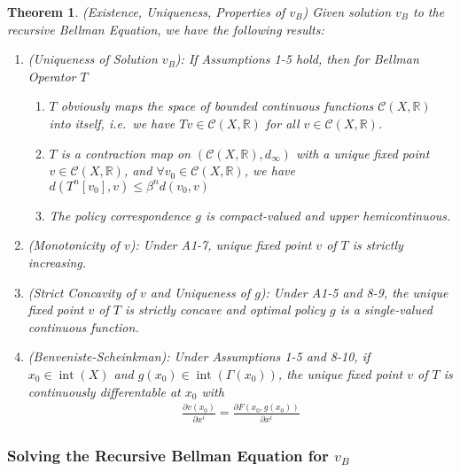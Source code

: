 \documentclass[12pt]{article}
\numberwithin{equation}{section} %
\theoremstyle{plain}
\newtheorem{thm}{Theorem}[section]
\theoremstyle{definition}
\theoremstyle{remark}
\newcommand{\sC}{\mathscr{C}}
\newcommand{\R}{\mathbb{R}}
\newcommand{\interior}{\operatorname{int}}
\begin{document}
\begin{thm}(Existence, Uniqueness, Properties of $v_B$)
Given solution $v_B$ to the recursive Bellman Equation,
we have the following results:
\begin{enumerate}
  \item
    \emph{(Uniqueness of Solution $v_B$)}:
    If Assumptions 1-5 hold, then for Bellman Operator $T$
    \begin{enumerate}[label=\emph{(\alph*)}]
      \item $T$ obviously maps the space of bounded continuous functions
        $\sC(X,\R)$ into itself, i.e.\ we have
        $Tv \in \sC(X,\R)$ for all $v\in\sC(X,\R)$.
      \item
        $T$ is a contraction map on $(\sC(X,\R),d_\infty)$ with a unique
        fixed point $v \in\sC(X,\R)$, and
        $\forall v_0 \in \sC(X,\R)$, we have
        $d(T^n[v_0],v) \leq \beta^n d(v_0,v)$
      \item
        The policy correspondence $g$ is compact-valued and upper
        hemicontinuous.
    \end{enumerate}

  \item
    \emph{(Monotonicity of $v$)}:
    Under A1-7, unique fixed point $v$ of $T$ is strictly increasing.

  \item
    \emph{(Strict Concavity of $v$ and Uniqueness of $g$)}:
    Under A1-5 and 8-9, the unique fixed point $v$ of $T$ is
    strictly concave and optimal policy $g$ is a single-valued
    continuous function.

  \item
    \emph{(Benveniste-Scheinkman)}:
    Under Assumptions 1-5 and 8-10, if $x_0\in \interior(X)$ and
    $g(x_0)\in\interior(\Gamma(x_0))$, the unique fixed point $v$
    of $T$ is continuously differentable at $x_0$ with
    \begin{align*}
      \frac{\partial v(x_0)}{\partial x^i}
      =
      \frac{\partial F(x_0, g(x_0))}{\partial x^i}
    \end{align*}
\end{enumerate}
\end{thm}



\clearpage
\subsubsection{Solving the Recursive Bellman Equation for $v_B$}
\end{document}
